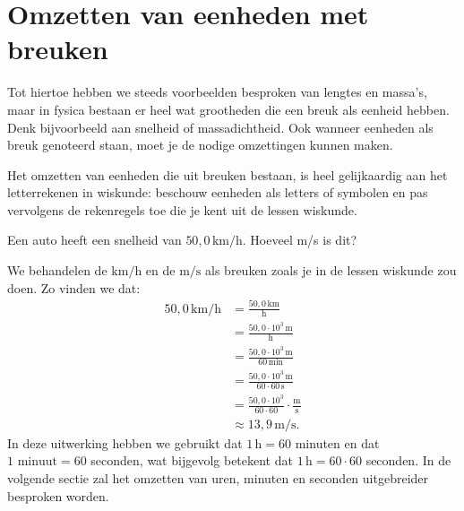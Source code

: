 \documentclass{ximera}
\begin{document}
\section{Omzetten van eenheden met breuken}
Tot hiertoe hebben we steeds voorbeelden besproken van lengtes en massa's, maar in fysica bestaan er heel wat grootheden die een breuk als eenheid hebben. Denk bijvoorbeeld aan snelheid of massadichtheid. Ook wanneer eenheden als breuk genoteerd staan, moet je de nodige omzettingen kunnen maken.

Het omzetten van eenheden die uit breuken bestaan, is heel gelijkaardig aan het letterrekenen in wiskunde: beschouw eenheden als letters of symbolen en pas vervolgens de rekenregels toe die je kent uit de lessen wiskunde.

\begin{example}[foldable=true,title={Voorbeeld: km/h naar m/s}]\nl
    Een auto heeft een snelheid van $50{,}0 \, \mathrm{km/h}$. Hoeveel m/s is dit?

    \begin{solution}\nl
        We behandelen de $\mathrm{km/h}$ en de $\mathrm{m/s}$ als breuken zoals je in de lessen wiskunde zou doen. Zo vinden we dat:
        \begin{align*}
        50{,}0 \, \mathrm{km/h} & = \frac{50{,}0 \, \mathrm{km}}{\mathrm{h}} \\
        & = \frac{50{,}0 \cdot 10^{3} \, \mathrm{m}}{\mathrm{h}} \\
        & = \frac{50{,}0 \cdot 10^{3} \, \mathrm{m}}{60 \, \mathrm{min}} \\
        & = \frac{50{,}0 \cdot 10^{3} \, \mathrm{m}}{60 \cdot 60 \, \mathrm{s}} \\
        & = \frac{50{,}0 \cdot 10^{3}}{60 \cdot 60} \cdot \frac{\mathrm{m}}{\mathrm{s}} \\
        & \approx 13{,}9 \, \mathrm{m/s}.
        \end{align*}
        In deze uitwerking hebben we gebruikt dat $1 \, \mathrm{h} = 60$ minuten en dat $1 \text{ minuut} = 60$ seconden, wat bijgevolg betekent dat $1 \, \mathrm{h} = 60 \cdot 60$ seconden. In de volgende sectie zal het omzetten van uren, minuten en seconden uitgebreider besproken worden.
    \end{solution}
\end{example}
\end{document}
